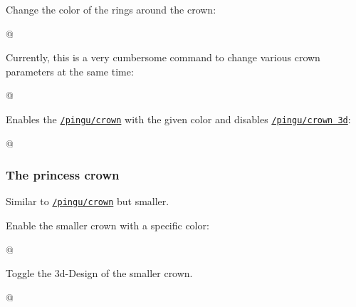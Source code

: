\documentclass[parskip=half,english,numbers=noenddot,footnotes=nomultiple,oneside]{scrartcl}
\def\lpingu#1{\lstinline[style=lstpingu,language=pingulang]'#1'}
\newcommand*\keyref[2][/pingu/]{\hyperref[pk:#1#2]{\lpingu{#1#2}}}
\begin{document}
{\def\pingu@color@crown{<crown-color>}
Change the color of the rings around the crown:
\begin{tcblisting}{@}
\begin{tikzpicture}
	\pingu[crown, crown gem ring=green]
\end{tikzpicture}
\end{tcblisting}
\endsubkeyexplain}

Currently, this is a very cumbersome command to change various crown parameters at the same time:
\begin{tcblisting}{@}
\begin{tikzpicture}
	\pingu[crown, eyes wink,
		crown position={1:(-.1cm,-.275cm){1.33}}]
\end{tikzpicture}
\end{tcblisting}
\endsubkeyexplain

Enables the \keyref{crown} with the given color and disables \keyref{crown 3d}:
\begin{tcblisting}{@}
\begin{tikzpicture}
	\pingu[crown 2d=green]
\end{tikzpicture}
\end{tcblisting}
\endkeyexplain

\subsubsection{The princess crown}
Similar to \keyref{crown} but smaller.

Enable the smaller crown with a specific color:
\begin{tcblisting}{@}
\begin{tikzpicture}
	\pingu[princess crown=green]
\end{tikzpicture}
\end{tcblisting}
\endkeyexplain

Toggle the 3d-Design of the smaller crown.
\begin{tcblisting}{@}
\begin{tikzpicture}
	\pingu[princess crown, princess crown 3d=false]
\end{tikzpicture}
\end{tcblisting}
\endsubkeyexplain
\end{document}
